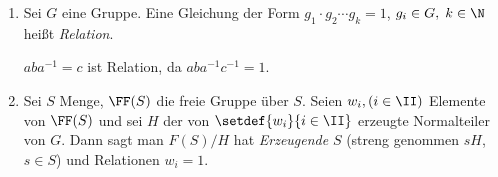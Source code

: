 \begin{defn}
\label{defn:3.3.2}
\begin{enumerate}[label=\roman{*})]
  \item Sei $G$ eine Gruppe.
Eine Gleichung der Form $g_1\cdot g_2\cdots g_k = 1$, $g_i\in G,\; k\in\N$ heißt
\emph{Relation}.
\begin{bspn}
$aba^{-1}=c$ ist Relation, da $aba^{-1}c^{-1}=1$.\bsphere
\end{bspn}
\item Sei $S$ Menge, $\FF(S)$ die freie Gruppe über $S$. Seien $w_i, (i\in \II)$
Elemente von $\FF(S)$ und sei $H$ der von $\setdef{w_i}{i\in\II}$ erzeugte
Normalteiler von $G$. Dann sagt man $F(S)/H$ hat \emph{Erzeugende} $S$ (streng
genommen $sH$, $s\in S$) und Relationen $w_i=1$.\fishhere
\end{enumerate}
\end{defn}
